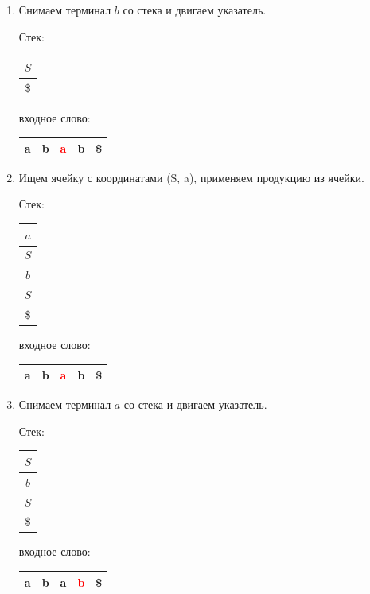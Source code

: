 \begin{example}
\begin{enumerate}
\item Снимаем терминал $b$ со стека и двигаем указатель.

    Стек: \,
    \begin{tabular}[c]{ |c| }
        \\ \hline
        $S$ \\ \hline
        \$ \\ \hline
    \end{tabular}
    \qquad  \qquad \qquad  \qquad входное слово: \,
    \begin{tabular}[c]{ |c|c|c|c|c| }
        \hline
        a & b & \textcolor{red}{a} & b & \$ \\ \hline
    \end{tabular}

    \begin{center}
      \resizebox{3cm}{2cm}{
    
  }
\end{center}

  \item Ищем ячейку с координатами (S, a), применяем продукцию из ячейки.

    Стек: \,
    \begin{tabular}[c]{ |c| }
        \\ \hline
        $a$ \\ \hline
        $S$ \\ \hline
        $b$ \\ \hline
        $S$ \\ \hline
        \$ \\ \hline
    \end{tabular}
    \qquad  \qquad \qquad  \qquad входное слово: \,
    \begin{tabular}[c]{ |c|c|c|c|c| }
        \hline
        a & b & \textcolor{red}{a} & b & \$ \\ \hline
    \end{tabular}

    \begin{center}
      \resizebox{5cm}{3cm}{
    
    }
  \end{center}

\item Снимаем терминал $a$ со стека и двигаем указатель.

    Стек: \,
    \begin{tabular}[c]{ |c| }
        \\ \hline
        $S$ \\ \hline
        $b$ \\ \hline
        $S$ \\ \hline
        \$ \\ \hline
    \end{tabular}
    \qquad  \qquad \qquad  \qquad входное слово: \,
    \begin{tabular}[c]{ |c|c|c|c|c| }
        \hline
        a & b & a & \textcolor{red}{b} & \$ \\ \hline
    \end{tabular}


\end{enumerate}
\end{example}
